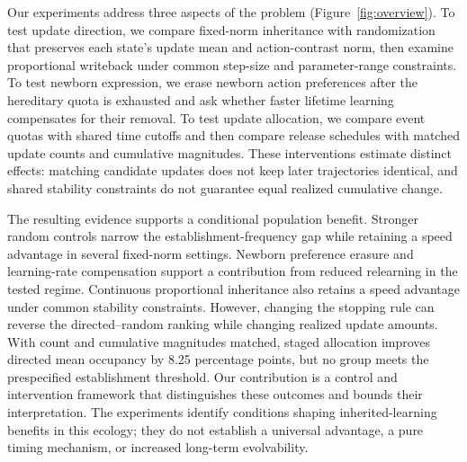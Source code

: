 \documentclass[11pt]{article}
\begin{document}
Our experiments address three aspects of the problem (Figure~\ref{fig:overview}). To test update direction, we compare fixed-norm inheritance with randomization that preserves each state's update mean and action-contrast norm, then examine proportional writeback under common step-size and parameter-range constraints. To test newborn expression, we erase newborn action preferences after the hereditary quota is exhausted and ask whether faster lifetime learning compensates for their removal. To test update allocation, we compare event quotas with shared time cutoffs and then compare release schedules with matched update counts and cumulative magnitudes. These interventions estimate distinct effects: matching candidate updates does not keep later trajectories identical, and shared stability constraints do not guarantee equal realized cumulative change.

The resulting evidence supports a conditional population benefit. Stronger random controls narrow the establishment-frequency gap while retaining a speed advantage in several fixed-norm settings. Newborn preference erasure and learning-rate compensation support a contribution from reduced relearning in the tested regime. Continuous proportional inheritance also retains a speed advantage under common stability constraints. However, changing the stopping rule can reverse the directed--random ranking while changing realized update amounts. With count and cumulative magnitudes matched, staged allocation improves directed mean occupancy by 8.25 percentage points, but no group meets the prespecified establishment threshold. Our contribution is a control and intervention framework that distinguishes these outcomes and bounds their interpretation. The experiments identify conditions shaping inherited-learning benefits in this ecology; they do not establish a universal advantage, a pure timing mechanism, or increased long-term evolvability.
\end{document}
